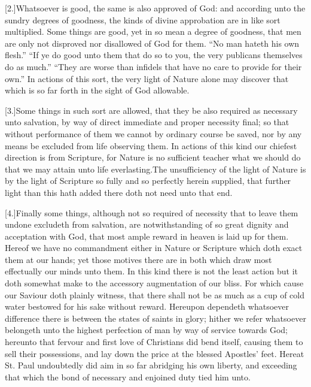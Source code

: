 [2.]Whatsoever is good, the same is also approved of God: and according unto the sundry degrees of goodness, the kinds of divine approbation are in like sort multiplied. Some things are good, yet in so mean a degree of goodness, that men are only not disproved nor disallowed of God for them. “No man hateth his own flesh.” “If ye do good unto them that do so to you, the very publicans themselves do as much.” “They are worse than infidels that have no care to provide for their own.” In actions of this sort, the very light of Nature alone may discover that which is so far forth in the sight of God allowable.

[3.]Some things in such sort are allowed, that they be also required as necessary unto salvation, by way of direct immediate and proper necessity final; so that without performance of them we cannot by ordinary course be saved, nor by any means be excluded from life observing them. In actions of this kind our chiefest direction is from Scripture, for Nature is no sufficient teacher what we should do that  we may attain unto life everlasting.The unsufficiency of the light of Nature is by the light of Scripture so fully and so perfectly herein supplied, that further light than this hath added there doth not need unto that end.

[4.]Finally some things, although not so required of necessity that to leave them undone excludeth from salvation, are notwithstanding of so great dignity and acceptation with God, that most ample reward in heaven is laid up for them. Hereof we have no commandment either in Nature or Scripture which doth exact them at our hands; yet those motives there are in both which draw most effectually our minds unto them. In this kind there is not the least action but it doth somewhat make to the accessory augmentation of our bliss. For which cause our Saviour doth plainly witness, that there shall not be as much as a cup of cold water bestowed for his sake without reward. Hereupon dependeth whatsoever difference there is between the states of saints in glory; hither we refer whatsoever belongeth unto the highest perfection of man by way of service towards God; hereunto that fervour and first love of Christians did bend itself, causing them to sell their possessions, and lay down the price at the blessed Apostles’ feet. Hereat St. Paul undoubtedly did aim in so far abridging his own liberty, and exceeding that which the bond of necessary and enjoined duty tied him unto.

